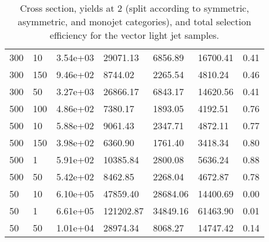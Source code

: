 \begin{table}
\begin{tabular}{lllllll}
300       &   10        &   3.54e+03  &   29071.13  &   6856.89   &   16700.41  &   0.41      \\ 
300       &   150       &   9.46e+02  &   8744.02   &   2265.54   &   4810.24   &   0.46      \\ 
300       &   50        &   3.27e+03  &   26866.17  &   6843.17   &   14620.56  &   0.41      \\ 
500       &   100       &   4.86e+02  &   7380.17   &   1893.05   &   4192.51   &   0.76      \\ 
500       &   10        &   5.88e+02  &   9061.43   &   2347.71   &   4872.11   &   0.77      \\ 
500       &   150       &   3.98e+02  &   6360.90   &   1761.40   &   3418.34   &   0.80      \\ 
500       &   1         &   5.91e+02  &   10385.84  &   2800.08   &   5636.24   &   0.88      \\ 
500       &   50        &   5.42e+02  &   8462.85   &   2268.04   &   4672.87   &   0.78      \\ 
50        &   10        &   6.10e+05  &   47859.40  &   28684.06  &   14400.69  &   0.00      \\ 
50        &   1         &   6.61e+05  &   121202.87 &   34849.16  &   61463.90  &   0.01      \\ 
50        &   50        &   1.01e+04  &   28974.34  &   8068.27   &   14747.42  &   0.14      \\ 
\hline
\end{tabular}
\caption{Cross section, yields at 2 \ifb (split according to symmetric, asymmetric, and monojet categories), and total selection efficiency for the vector light jet samples.}
\label{tab:dm_V_g1_2fb}
\end{table}
